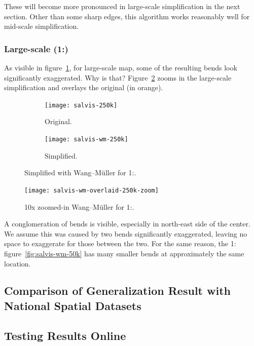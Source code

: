 \documentclass[a4paper]{article}
\newcommand{\WM}{Wang--M{\"u}ller}
\begin{document}
These will become
more pronounced in large-scale simplification in the next section. Other than
some sharp edges, this algorithm works reasonably well for mid-scale
simplification.

\subsubsection{Large-scale (1:)}

As visible in figure~\ref{fig:salvis-wm-250k}, for large-scale map, some of the
resulting bends look significantly exaggerated. Why is that?
Figure~\ref{fig:salvis-wm-250k-overlaid-zoom} zooms in the large-scale
simplification and overlays the original (in orange).

\begin{figure}[ht]
    \centering
    \begin{subfigure}[b]{.49\textwidth}
        \centering
        \texttt{[image: salvis-250k]}
        \caption{Original.}
    \end{subfigure}
    \hfill
    \begin{subfigure}[b]{.49\textwidth}
        \centering
        \texttt{[image: salvis-wm-250k]}
        \caption{Simplified.}
    \end{subfigure}
    \caption{Simplified with {\WM} for 1:.}
    \label{fig:salvis-wm-250k}
\end{figure}

\begin{figure}[ht]
    \centering
    \texttt{[image: salvis-wm-overlaid-250k-zoom]}
    \caption{10x zoomed-in {\WM} for 1:.}
    \label{fig:salvis-wm-250k-overlaid-zoom}
\end{figure}

A conglomeration of bends is visible, especially in north-east side of the
center. We assume this was caused by two bends significantly exaggerated,
leaving no space to exaggerate for those between the two. For the same reason,
the 1: figure~\ref{fig:salvis-wm-50k} has many smaller bends
at approximately the same location.

\subsection{Comparison of Generalization Result with National Spatial Datasets}


\subsection{Testing Results Online}
\label{sec:testing-results-online}
\end{document}
